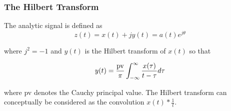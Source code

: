 \begin{frame}
    \frametitle{The Hilbert Transform}
    \small
    The analytic signal is defined as 
    \begin{equation}
        z(t) = x(t) + j y(t) = a(t) e^{j\theta}
    \end{equation}
    
    where $j^2=-1$ and $y(t)$ is the Hilbert transform of $x(t)$ so that
    
    \begin{equation}
        y(t) = \frac{\rm{pv}}{\pi} \int_{-\infty}^{\infty} \frac{x(\tau)}{t-\tau} d\tau
    \end{equation}
    
    where pv denotes the Cauchy principal value.  The Hilbert transform can conceptually be considered as the convolution $x(t) * \frac{1}{t}$.
   
\end{frame}